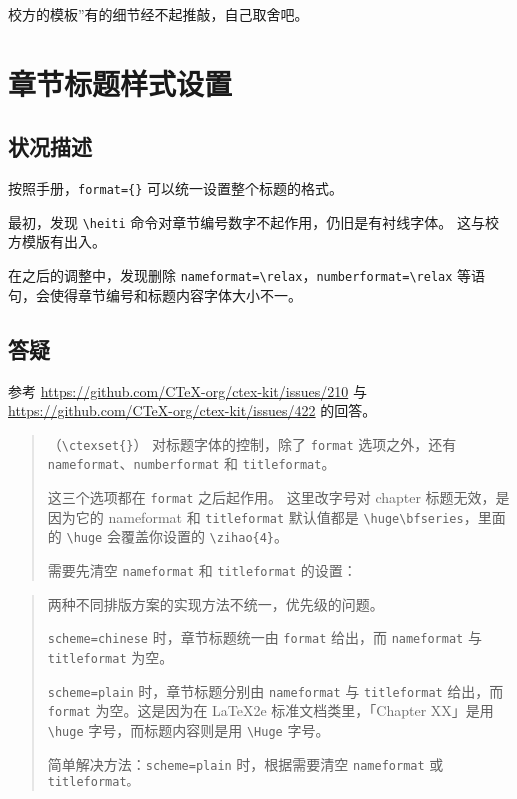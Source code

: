 \documentclass[../Main/thesis.tex]{subfiles}
\begin{document}
校方的模板''有的细节经不起推敲，自己取舍吧。

\section{章节标题样式设置}

\subsection{状况描述}

按照手册，\texttt{format=\{\}} 可以统一设置整个标题的格式。

最初，发现 \texttt{\textbackslash{}heiti}
命令对章节编号数字不起作用，仍旧是有衬线字体。 这与校方模版有出入。

在之后的调整中，发现删除
\texttt{nameformat=\textbackslash{}relax}，\texttt{numberformat=\textbackslash{}relax}
等语句，会使得章节编号和标题内容字体大小不一。

\subsection{答疑}

参考 \url{https://github.com/CTeX-org/ctex-kit/issues/210} 与
\url{https://github.com/CTeX-org/ctex-kit/issues/422} 的回答。

\begin{quote}
（\texttt{\textbackslash{}ctexset\{\}}） 对标题字体的控制，除了
\texttt{format} 选项之外，还有
\texttt{nameformat}、\texttt{numberformat} 和 \texttt{titleformat}。

这三个选项都在 \texttt{format} 之后起作用。 这里改字号对 chapter
标题无效，是因为它的 nameformat 和 \texttt{titleformat} 默认值都是
\texttt{\textbackslash{}huge\textbackslash{}bfseries}，里面的
\texttt{\textbackslash{}huge} 会覆盖你设置的
\texttt{\textbackslash{}zihao\{4\}}。

需要先清空 \texttt{nameformat} 和 \texttt{titleformat} 的设置：
\end{quote}

\begin{quote}
两种不同排版方案的实现方法不统一，优先级的问题。

\texttt{scheme=chinese} 时，章节标题统一由 \texttt{format} 给出，而
\texttt{nameformat} 与 \texttt{titleformat} 为空。

\texttt{scheme=plain} 时，章节标题分别由 \texttt{nameformat} 与
\texttt{titleformat} 给出，而 \texttt{format} 为空。这是因为在 LaTeX2e
标准文档类里，「Chapter XX」是用 \texttt{\textbackslash{}huge}
字号，而标题内容则是用 \texttt{\textbackslash{}Huge} 字号。

简单解决方法：\texttt{scheme=plain} 时，根据需要清空 \texttt{nameformat}
或 \texttt{titleformat。}
\end{quote}
\end{document}
